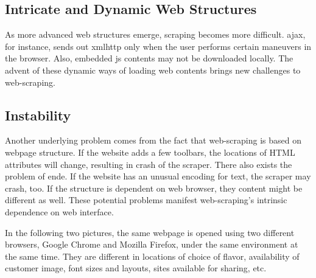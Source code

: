 \documentclass[12pt]{report}
\begin{document}
\subsection{Intricate and Dynamic Web Structures}

As more advanced web structures emerge, scraping becomes more difficult. \gls{ajax}, for instance, sends out \gls{xmlhttp} only when the user performs certain maneuvers in the browser. Also, embedded \gls{js} contents may not be downloaded locally. The advent of these dynamic ways of loading web contents brings new challenges to web-scraping.

\subsection{Instability}
Another underlying problem comes from the fact that web-scraping is based on webpage structure. If the website adds a few toolbars, the locations of HTML attributes will change, resulting in crash of the scraper. There also exists the problem of \gls{ende}. If the website has an unusual encoding for text, the scraper may crash, too. If the structure is dependent on web browser, they content might be different as well. These potential problems manifest web-scraping's intrinsic dependence on web interface.

In the following two pictures, the same webpage is opened using two different browsers, Google Chrome and Mozilla Firefox, under the same environment at the same time. They are different in locations of choice of flavor, availability of customer image, font sizes and layouts, sites available for sharing, etc.
\end{document}
